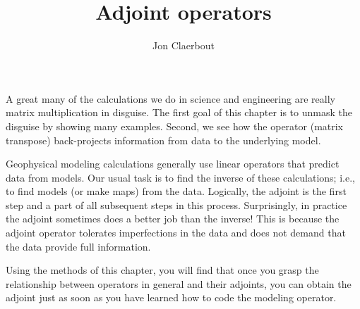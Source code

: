 \def\CAKEDIR{.}

\title{Adjoint operators}
\author{Jon Claerbout}
\label{paper:conj}
\maketitle

A great many of the calculations
we do in science and engineering
are really matrix multiplication in disguise.
The first goal of this chapter is to unmask the disguise
by showing many examples.
Second, we see how the 
 operator (matrix transpose)
back-projects information from data to the underlying model.

\par
Geophysical modeling calculations
generally use linear operators that predict data from models.
Our usual task is to find the inverse of these calculations;
i.e., to find models (or make maps) from the data.
Logically, the adjoint is the first step
and a part of all subsequent steps in this  process.
Surprisingly, in practice the adjoint sometimes does a better job
than the inverse!
This is because the adjoint operator tolerates imperfections
in the data and does not demand that the data provide full information.

\par
Using the methods of this chapter,
you will find that
once you grasp the relationship between operators in general
and their adjoints,
you can obtain the adjoint just
as soon as you have learned how to code
the modeling operator.

